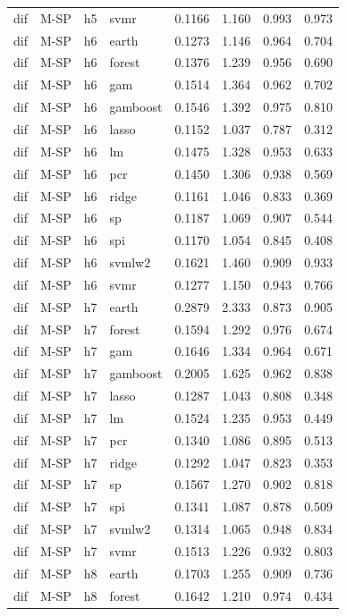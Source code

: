 \begin{ThreePartTable}
\begin{longtable}[t]{llclcccc}
dif & M-SP & h5 & svmr & 0.1166 & 1.160 & 0.993 & 0.973\\
\addlinespace
dif & M-SP & h6 & earth & 0.1273 & 1.146 & 0.964 & 0.704\\
dif & M-SP & h6 & forest & 0.1376 & 1.239 & 0.956 & 0.690\\
dif & M-SP & h6 & gam & 0.1514 & 1.364 & 0.962 & 0.702\\
dif & M-SP & h6 & gamboost & 0.1546 & 1.392 & 0.975 & 0.810\\
dif & M-SP & h6 & lasso & 0.1152 & 1.037 & 0.787 & 0.312\\
dif & M-SP & h6 & lm & 0.1475 & 1.328 & 0.953 & 0.633\\
dif & M-SP & h6 & pcr & 0.1450 & 1.306 & 0.938 & 0.569\\
dif & M-SP & h6 & ridge & 0.1161 & 1.046 & 0.833 & 0.369\\
dif & M-SP & h6 & sp & 0.1187 & 1.069 & 0.907 & 0.544\\
dif & M-SP & h6 & spi & 0.1170 & 1.054 & 0.845 & 0.408\\
dif & M-SP & h6 & svmlw2 & 0.1621 & 1.460 & 0.909 & 0.933\\
dif & M-SP & h6 & svmr & 0.1277 & 1.150 & 0.943 & 0.766\\
\addlinespace
dif & M-SP & h7 & earth & 0.2879 & 2.333 & 0.873 & 0.905\\
dif & M-SP & h7 & forest & 0.1594 & 1.292 & 0.976 & 0.674\\
dif & M-SP & h7 & gam & 0.1646 & 1.334 & 0.964 & 0.671\\
dif & M-SP & h7 & gamboost & 0.2005 & 1.625 & 0.962 & 0.838\\
dif & M-SP & h7 & lasso & 0.1287 & 1.043 & 0.808 & 0.348\\
dif & M-SP & h7 & lm & 0.1524 & 1.235 & 0.953 & 0.449\\
dif & M-SP & h7 & pcr & 0.1340 & 1.086 & 0.895 & 0.513\\
dif & M-SP & h7 & ridge & 0.1292 & 1.047 & 0.823 & 0.353\\
dif & M-SP & h7 & sp & 0.1567 & 1.270 & 0.902 & 0.818\\
dif & M-SP & h7 & spi & 0.1341 & 1.087 & 0.878 & 0.509\\
dif & M-SP & h7 & svmlw2 & 0.1314 & 1.065 & 0.948 & 0.834\\
dif & M-SP & h7 & svmr & 0.1513 & 1.226 & 0.932 & 0.803\\
\addlinespace
dif & M-SP & h8 & earth & 0.1703 & 1.255 & 0.909 & 0.736\\
dif & M-SP & h8 & forest & 0.1642 & 1.210 & 0.974 & 0.434\\

\end{longtable}
\end{ThreePartTable}
